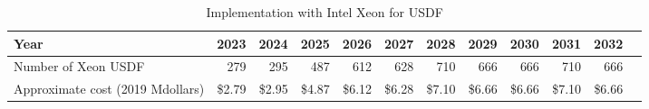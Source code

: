 \tiny \begin{longtable} { |p{}  |r  |r  |r  |r  |r  |r  |r  |r  |r  |r  |r |} 
\caption{Implementation with Intel Xeon for USDF \label{tab:opsXeonUSDF}}\\ 
\hline 
\textbf{Year}&\textbf{2023}&\textbf{2024}&\textbf{2025}&\textbf{2026}&\textbf{2027}&\textbf{2028}&\textbf{2029}&\textbf{2030}&\textbf{2031}&\textbf{2032} \\ \hline
{Number of Xeon USDF}&{279}&{295}&{487}&{612}&{628}&{710}&{666}&{666}&{710}&{666} \\ \hline
{Approximate cost (2019 Mdollars)}&{\$2.79}&{\$2.95}&{\$4.87}&{\$6.12}&{\$6.28}&{\$7.10}&{\$6.66}&{\$6.66}&{\$7.10}&{\$6.66} \\ \hline
\end{longtable} \normalsize
